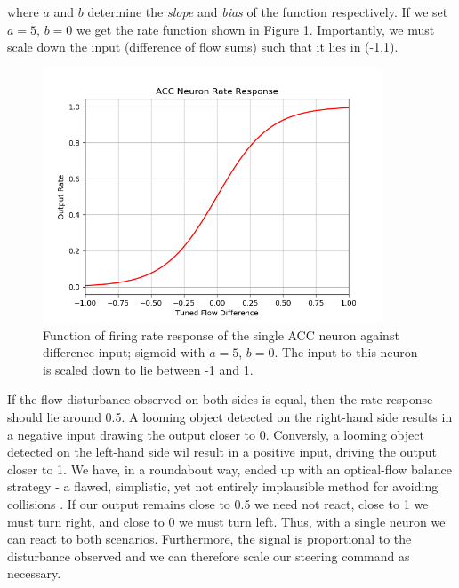 \documentclass[a4paper,11pt,twoside,openright]{article}
\begin{document}
where $a$ and $b$ determine the \textit{slope} and \textit{bias} of the function
respectively. If we set $a = 5$, $b = 0$ we get the rate function shown in Figure
\ref{fig:accrate}. Importantly, we must scale down the input (difference of flow
sums) such that it lies in (-1,1).\newline\par

\begin{figure}[h!]
  \centering
  \includegraphics[width=0.9\textwidth]{ACCRate}
  \caption{\label{fig:accrate} Function of firing rate response of the single ACC
    neuron against difference input; sigmoid with $a = 5$, $b = 0$. The input to
  this neuron is scaled down to lie between -1 and 1.}
\end{figure}

If the flow disturbance observed on both sides is equal, then the rate response
should lie around 0.5. A looming object detected on the right-hand side results
in a negative input drawing the output closer to 0. Conversly, a looming object
detected on the left-hand side wil result in a positive input, driving the output
closer to 1. We have, in a roundabout way, ended up with an optical-flow balance
strategy - a flawed, simplistic, yet not entirely implausible method for avoiding
collisions \cite{Julien2017}. If our output remains close to 0.5 we need not
react, close to 1 we must turn right, and close to 0 we must turn left. Thus,
with a single neuron we can react to both scenarios. Furthermore, the signal
is proportional to the disturbance observed and we can therefore scale our
steering command as necessary.
\newline\par
\end{document}
